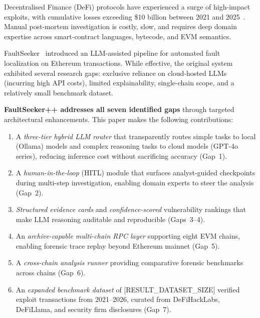 \documentclass[conference]{IEEEtran}
\begin{document}
Decentralised Finance (DeFi) protocols have experienced a surge of
high-impact exploits, with cumulative losses exceeding \$10 billion
between 2021 and 2025~\cite{defihacklabs2024}.
Manual post-mortem investigation is costly, slow, and requires
deep domain expertise across smart-contract languages, bytecode, and
EVM semantics.

FaultSeeker~\cite{faultseeker} introduced an LLM-assisted pipeline for
automated fault localization on Ethereum transactions.
While effective, the original system exhibited several research gaps:
exclusive reliance on cloud-hosted LLMs (incurring high API costs),
limited explainability, single-chain scope, and a relatively small
benchmark dataset.

\textbf{FaultSeeker++ addresses all seven identified gaps} through targeted
architectural enhancements. This paper makes the following contributions:

\begin{enumerate}
  \item A \textit{three-tier hybrid LLM router} that transparently
        routes simple tasks to local (Ollama) models and complex
        reasoning tasks to cloud models (GPT-4o series), reducing
        inference cost without sacrificing accuracy (Gap~1).

  \item A \textit{human-in-the-loop} (HITL) module that surfaces
        analyst-guided checkpoints during multi-step investigation,
        enabling domain experts to steer the analysis (Gap~2).

  \item \textit{Structured evidence cards} and \textit{confidence-scored}
        vulnerability rankings that make LLM reasoning auditable and
        reproducible (Gaps~3--4).

  \item An \textit{archive-capable multi-chain RPC layer} supporting
        eight EVM chains, enabling forensic trace replay beyond Ethereum
        mainnet (Gap~5).

  \item A \textit{cross-chain analysis runner} providing comparative
        forensic benchmarks across chains (Gap~6).

  \item An \textit{expanded benchmark dataset} of [RESULT\_DATASET\_SIZE]
        verified exploit transactions from 2021--2026,
        curated from DeFiHackLabs, DeFiLlama, and security firm
        disclosures (Gap~7).
\end{enumerate}
\end{document}
